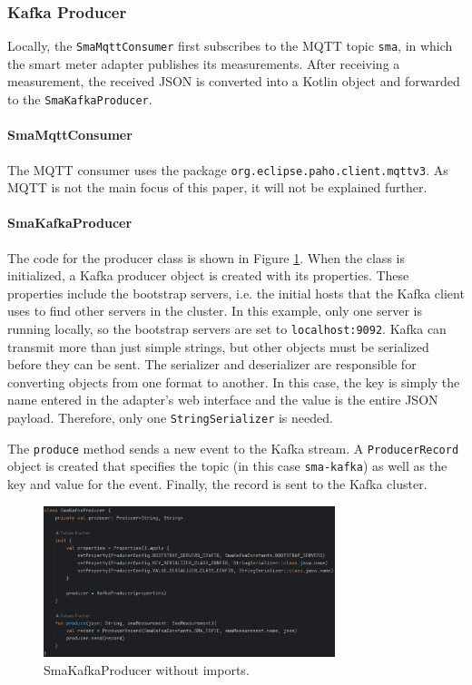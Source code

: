 \subsubsection{Kafka Producer}

Locally, the \lstinline{SmaMqttConsumer} first subscribes to the MQTT topic \lstinline{sma}, in which the smart meter adapter publishes its measurements. After receiving a measurement, the received JSON is converted into a Kotlin object and forwarded to the \lstinline{SmaKafkaProducer}.

\paragraph{SmaMqttConsumer}

The MQTT consumer uses the package \lstinline{org.eclipse.paho.client.mqttv3}. As MQTT is not the main focus of this paper, it will not be explained further.

\paragraph{SmaKafkaProducer}

The code for the producer class is shown in Figure \ref{fig:producer}. When the class is initialized, a Kafka producer object is created with its properties. These properties include the bootstrap servers, i.e. the initial hosts that the Kafka client uses to find other servers in the cluster. In this example, only one server is running locally, so the bootstrap servers are set to \lstinline{localhost:9092}. Kafka can transmit more than just simple strings, but other objects must be serialized before they can be sent. The serializer and deserializer are responsible for converting objects from one format to another. In this case, the key is simply the name entered in the adapter's web interface and the value is the entire JSON payload. Therefore, only one \lstinline{StringSerializer} is needed.

The \lstinline{produce} method sends a new event to the Kafka stream. A \lstinline{ProducerRecord} object is created that specifies the topic (in this case \lstinline{sma-kafka}) as well as the key and value for the event. Finally, the record is sent to the Kafka cluster.

\begin{figure}[ht]
    \centering
    \includegraphics[width=8.5cm]{images/producer.png}
    \caption{SmaKafkaProducer without imports.}
    \label{fig:producer}
\end{figure}

